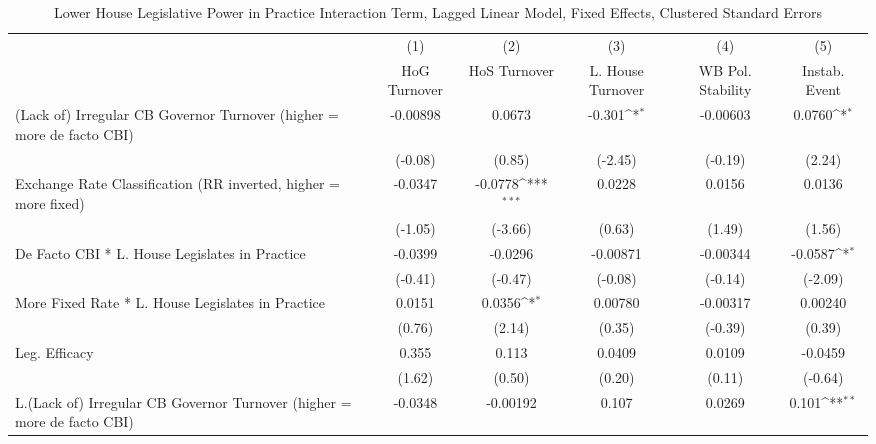 {
\def\sym#1{\ifmmode^{#1}\else\(^{#1}\)\fi}
\begin{longtable}{l*{5}{c}}
\caption{Lower House Legislative Power in Practice Interaction Term, Lagged Linear Model, Fixed Effects, Clustered Standard Errors \label{llpintlagsDF}}\\
\hline\hline\endfirsthead\hline\endhead\hline\endfoot\endlastfoot
                &\multicolumn{1}{c}{(1)}&\multicolumn{1}{c}{(2)}&\multicolumn{1}{c}{(3)}&\multicolumn{1}{c}{(4)}&\multicolumn{1}{c}{(5)}\\
                &\multicolumn{1}{c}{HoG Turnover}&\multicolumn{1}{c}{HoS Turnover}&\multicolumn{1}{c}{L. House Turnover}&\multicolumn{1}{c}{WB Pol. Stability}&\multicolumn{1}{c}{Instab. Event}\\
\hline
(Lack of) Irregular CB Governor Turnover (higher = more de facto CBI)& -0.00898         &   0.0673         &   -0.301\sym{*}  & -0.00603         &   0.0760\sym{*}  \\
                &  (-0.08)         &   (0.85)         &  (-2.45)         &  (-0.19)         &   (2.24)         \\
[1em]
Exchange Rate Classification (RR inverted, higher = more fixed)&  -0.0347         &  -0.0778\sym{***}&   0.0228         &   0.0156         &   0.0136         \\
                &  (-1.05)         &  (-3.66)         &   (0.63)         &   (1.49)         &   (1.56)         \\
[1em]
De Facto CBI * L. House Legislates in Practice&  -0.0399         &  -0.0296         & -0.00871         & -0.00344         &  -0.0587\sym{*}  \\
                &  (-0.41)         &  (-0.47)         &  (-0.08)         &  (-0.14)         &  (-2.09)         \\
[1em]
More Fixed Rate * L. House Legislates in Practice&   0.0151         &   0.0356\sym{*}  &  0.00780         & -0.00317         &  0.00240         \\
                &   (0.76)         &   (2.14)         &   (0.35)         &  (-0.39)         &   (0.39)         \\
[1em]
Leg. Efficacy   &    0.355         &    0.113         &   0.0409         &   0.0109         &  -0.0459         \\
                &   (1.62)         &   (0.50)         &   (0.20)         &   (0.11)         &  (-0.64)         \\
[1em]
L.(Lack of) Irregular CB Governor Turnover (higher = more de facto CBI)&  -0.0348         & -0.00192         &    0.107         &   0.0269         &    0.101\sym{**} \\

\end{longtable}}
